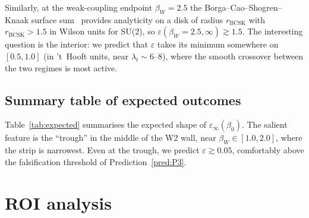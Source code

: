 \documentclass[11pt,a4paper]{article}
\theoremstyle{definition}
\theoremstyle{remark}
\begin{document}
Similarly, at the weak-coupling endpoint $\beta_W = 2.5$ the
Borga--Cao--Shogren--Knaak surface sum~\cite{BCSK24} provides
analyticity on a disk of radius $r_{\mathrm{BCSK}}$ with
$r_{\mathrm{BCSK}} > 1.5$ in Wilson units for SU(2), so
$\varepsilon(\beta_W = 2.5, \infty) \gtrsim 1.5$. The interesting
question is the interior: we predict that $\varepsilon$ takes its
minimum somewhere on $[0.5, 1.0]$ (in 't~Hooft units, near
$\lambda_t \sim 6$--$8$), where the smooth crossover between the
two regimes is most active.

\subsection{Summary table of expected outcomes}

\begin{table}[t]
\centering
\caption{Expected order-of-magnitude $\varepsilon_\infty(\beta_0)$
in Wilson units for SU(2). Values for $\beta = 0.1, 2.5$ are
\emph{lower bounds} from CNS25 and BCSK24 rigorous disks; the
interior values are predictions of this paper.}
\label{tab:expected}
\end{table}

Table~\ref{tab:expected} summarises the expected shape of
$\varepsilon_\infty(\beta_0)$. The salient feature is the
``trough'' in the middle of the W2 wall, near
$\beta_W \in [1.0, 2.0]$, where the strip is narrowest. Even at
the trough, we predict $\varepsilon \gtrsim 0.05$, comfortably
above the falsification threshold of Prediction~\ref{pred:P3}.

\medskip

\section{ROI analysis}\label{sec:ROI}
\end{document}
